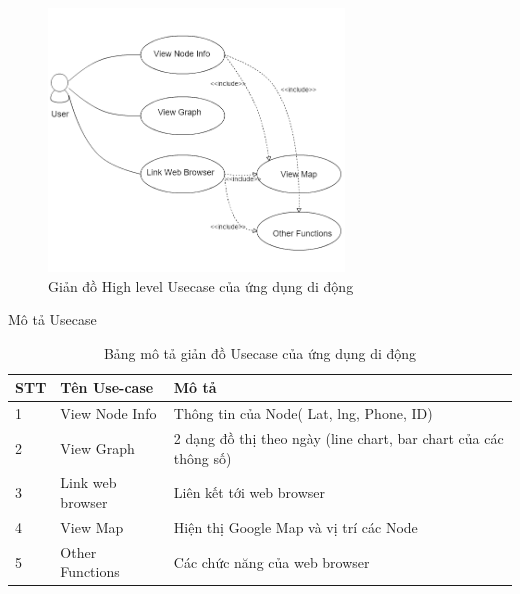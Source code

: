 \begin{figure}[H]
\centering    
\includegraphics[width=0.7\textwidth]{app_usecase}
\caption[Giản đồ High level Usecase của ứng dụng di động]{Giản đồ High level Usecase của ứng dụng di động}
\label{fig:app_usecase}
\end{figure}

Mô tả Usecase

\begin{table}[H]
\centering
\caption{Bảng mô tả giản đồ Usecase của ứng dụng di động}
\label{table:usecase_mobile}
\begin{tabular}{|l|l|l|}
\hline
STT & Tên Use-case     & Mô tả                                                            \\ \hline
1   & View Node Info   & Thông tin của Node( Lat, lng, Phone, ID)                         \\ \hline
2   & View Graph       & 2 dạng đồ thị theo ngày (line chart, bar chart của các thông số) \\ \hline
3   & Link web browser & Liên kết tới web browser                                         \\ \hline
4   & View Map         & Hiện thị Google Map và vị trí các Node                           \\ \hline
5   & Other Functions  & Các chức năng của web browser                                    \\ \hline
\end{tabular}
\end{table}













